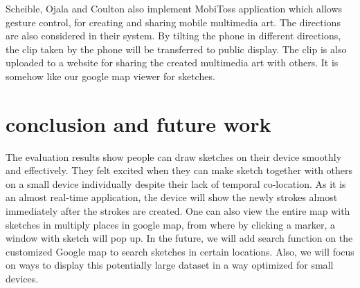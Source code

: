 \documentclass{chi2009}
\begin{document}
Scheible, Ojala and Coulton \cite{mobitoss:scheible} also implement MobiToss application which allows gesture control, for creating and sharing mobile multimedia art. The directions are also considered in their system. By tilting the phone in different directions, the clip taken by the phone will be transferred to public display. The clip is also uploaded to a website for sharing the created multimedia art with others. It is somehow like our google map viewer for sketches.

\section{conclusion and future work}

The evaluation results show people can draw sketches on their device smoothly
and effectively. They felt excited when they can make sketch together with
others on a small device individually despite their lack of temporal
co-location. As it is an almost real-time application, the device will show the
newly strokes almost immediately after the strokes are created. One can also
view the entire map with sketches in multiply places in google map, from where
by clicking a marker, a window with sketch will pop up. In the future, we will
add search function on the customized Google map to search sketches in certain
locations. Also, we will focus on ways to display this potentially large
dataset in a way optimized for small devices.





\newpage
\appendix

\end{document}
